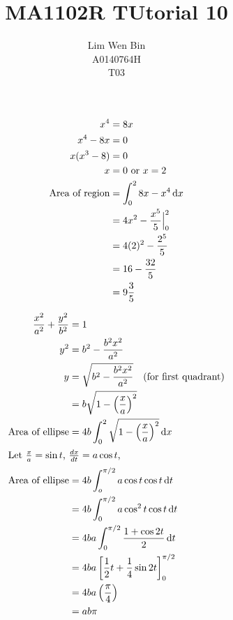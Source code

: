 \documentclass[12pt]{article}
\newcommand*\diff{\mathop{}\!\mathrm{d}}
\newenvironment{problem}[2][Problem]{\begin{trivlist}
\item[\hskip \labelsep {\bfseries #1}\hskip \labelsep {\bfseries #2.}]}{\end{trivlist}}
\begin{document}
\title{MA1102R TUtorial 10}
\author{Lim Wen Bin \\
A0140764H\\
T03}
\maketitle

\begin{problem}{1}
\end{problem}
\begin{align*}
x^4 &= 8x\\
x^4 - 8x &= 0\\
x(x^3 - 8) &= 0\\
x &= 0 \text{ or } x = 2\\
\text{Area of region} &= \int_{0}^{2} 8x - x^4 \diff x\\
&= 4x^2 - \frac{x^5}{5} \Bigl|_{0}^{2}\\ 
&= 4(2)^2 - \frac{2^5}{5} \\ 
&= 16 - \frac{32}{5} \\ 
&= 9 \frac{3}{5} \\ 
\end{align*}
\filbreak

\begin{problem}{2.1}
\end{problem}
\begin{align*}
\frac{x^2}{a^2} + \frac{y^2}{b^2} &= 1\\
y^2 &= b^2 - \frac{b^2x^2}{a^2} \\
y &= \sqrt{b^2 - \frac{b^2x^2}{a^2}} \quad \text{(for first quadrant)} \\
&= b\sqrt{1 - \left(\frac{x}{a}\right)^2}\\
\text{Area of ellipse} &= 4b\int_{0}^{2} \sqrt{1 - \left(\frac{x}{a}\right)^2} \diff x\\
\intertext{Let $ \frac{x}{a} = \sin t$, $\frac{dx}{dt} = a\cos t$,}
\text{Area of ellipse} &= 4b\int_{o}^{\pi/2} a\cos t \cos t \diff t\\
&= 4b\int_{0}^{\pi/2} a\cos^{2} t \cos t \diff t\\
&= 4ba \int_{0}^{\pi/2} \frac{1 + \cos 2t}{2} \diff t\\
&= 4ba \left[ \frac{1}{2}t + \frac{1}{4}\sin2t \right]_{0}^{\pi/2}\\
&= 4ba \left( \frac{\pi}{4} \right) \\
&= ab\pi\\
\end{align*}
\filbreak
\end{document}
